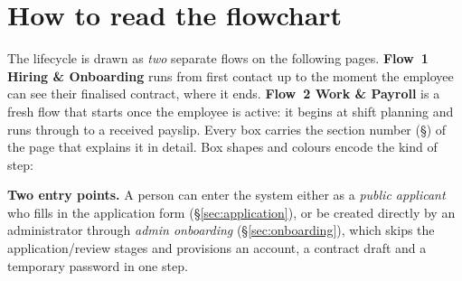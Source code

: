 \documentclass[11pt,a4paper]{article}
\begin{document}
\section*{How to read the flowchart}

The lifecycle is drawn as \emph{two} separate flows on the following pages.
\textbf{Flow~1 \textemdash{} Hiring \& Onboarding} runs from first contact up to the
moment the employee can see their finalised contract, where it ends.
\textbf{Flow~2 \textemdash{} Work \& Payroll} is a fresh flow that starts once the
employee is active: it begins at shift planning and runs through to a received
payslip. Every box carries the section number (\S) of the page that explains it
in detail. Box shapes and colours encode the kind of step:

\vspace{0.4em}
\begin{center}
\end{center}

\vspace{0.4em}
\noindent\textbf{Two entry points.} A person can enter the system either as a
\emph{public applicant} who fills in the application form (\S\ref{sec:application}),
or be created directly by an administrator through \emph{admin onboarding}
(\S\ref{sec:onboarding}), which skips the application/review stages and
provisions an account, a contract draft and a temporary password in one step.

\clearpage
\end{document}

